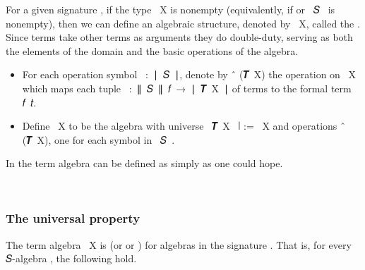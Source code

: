 For a given signature , if the type ~\ab X is nonempty
(equivalently, if  or ~\ab 𝑆~ is nonempty), then we can define
an algebraic structure, denoted by ~\ab X, called the    . Since terms take other terms
as arguments they do double-duty, serving as both the elements of the domain and the basic
operations of the algebra.

\begin{itemize}
\item For each operation symbol ~\as :~\af ∣~\ab 𝑆~\af ∣, denote by
  ~\af ̂ (\af 𝑻~\ab X) the operation on ~\ab X which maps each tuple
  ~\as :~\af ∥~\ab 𝑆~\af ∥~\ab 𝑓~\as →~\af ∣~\af 𝑻~\ab X~\af ∣ of terms to the
  formal term \ab 𝑓~\ab 𝑡. 
\item Define ~\ab X to be the algebra with universe ~\af 𝑻~\ab X~\af
  ∣ := ~\ab X and operations ~\af ̂ (\af 𝑻~\ab X), one for each
  symbol  in ~\ab 𝑆~. 
\end{itemize}

In \agda the term algebra can be defined as simply as one could hope.
\ccpad
\begin{code}%
\>[0]\AgdaSpace{}%
\AgdaSymbol{:}\AgdaSpace{}%
\AgdaSymbol{\{}\AgdaSpace{}%
\AgdaSymbol{:}\AgdaSpace{}%
\AgdaSymbol{\}(}\AgdaSpace{}%
\AgdaSymbol{:}\AgdaSpace{}%
\AgdaSpace{}%
\AgdaSpace{}%
\AgdaSymbol{)}\AgdaSpace{}%
\AgdaSpace{}%
\AgdaSpace{}%
\AgdaSymbol{(}\AgdaSpace{}%
\AgdaSymbol{)}\AgdaSpace{}%
\<%
\\
\>[0]\AgdaSpace{}%
\AgdaSpace{}%
\AgdaSymbol{=}\AgdaSpace{}%
\AgdaSpace{}%
\AgdaSpace{}%
\AgdaOperator{\AgdaInductiveConstructor{,}}\AgdaSpace{}%
\<%
\end{code}

\subsubsection{The universal property}\label{the-universal-property}

The term algebra ~\ab X is  (or  or
) for algebras in the signature . That is, for every
𝑆-algebra , the following hold. 

